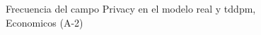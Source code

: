 \begin{figure}[H]
    \centering
    
    \caption{Frecuencia del campo Privacy en el modelo real y tddpm, Economicos (A-2)}
    \label{frecuency-Privacy-tddpm_mlp}
\end{figure}